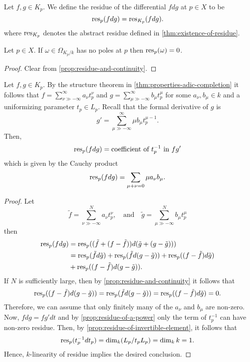 \begin{definition}\label{def:residue-at-p}
	Let $f,g \in K_{p}$. We define the residue of the differential $fdg$ at $p\in X$ to be
	\[
		\operatorname{res}_{p}(fdg) = \operatorname{res}_{K_{p}}(fdg).
	\]
	where $\operatorname{res}_{K_{p}}$ denotes the abstract residue defined in \cref{thm:existence-of-residue}.
\end{definition} 
\begin{proposition}\label{prop:no-poles-zero-residue}
	Let $p\in X$. If $\omega \in \Omega_{K_{p}/k}$ has no poles at $p$ then $\operatorname{res}_{p}(\omega) = 0$.
\end{proposition}
\begin{proof}
	Clear from \cref{prop:residue-and-continuity}.
\end{proof}

\begin{theorem}\label{thm:resiude-coincides-with-coefficient}
	Let $f,g \in K_{p}$. By the structure theorem in \cref{thm:properties-adic-completion} it follows that $f = \sum_{\nu \gg -\infty}^{\infty} a_{\nu}t_{p}^{\nu}$ and $g = \sum_{\mu \gg -\infty}^{\infty} b_{\mu}t_{p}^{\mu}$ for some $a_{\nu},b_{\mu} \in k$ and a uniformizing parameter $t_{p}\in L_{p} $. Recall that the formal derivative of $g$ is
	\[
		g' = \sum_{\mu \gg -\infty}^{\infty} \mu b_{\mu}t_{p}^{\mu -1}.
	\]
	Then,
	\[
		\operatorname{res}_{p}(fdg) = \text{coefficient of }t_{p}^{-1}\text{ in } fg'
	\]
	which is given by the Cauchy product
	\[
		\operatorname{res}_{p}(fdg) = \sum_{\mu + \nu = 0}\mu a_\nu{}b_{\mu}.
	\]
\end{theorem}
\begin{proof}
	Let
	\[
		\tilde{f} = \sum_{\nu\gg-\infty}^{N} a_{\nu}t_{p}^{\nu},\quad\text{and}\quad\tilde{g} = \sum_{\mu\gg-\infty}^{N} b_{\mu}t_{p}^{\mu}
	\]
	then 
	\begin{align*}
		\operatorname{res}_{p}(fdg) &= \operatorname{res}_{p}( (\tilde{f} + (f - \tilde{f}))d(\tilde{g} + (g - \tilde{g}))) \\
		&= \operatorname{res}_{p}(\tilde{f}d\tilde{g}) + \operatorname{res}_{p}(\tilde{f}d(g - \tilde{g})) + \operatorname{res}_{p}((f-\tilde{f}) d\tilde{g}) \\ &+ \operatorname{res}_{p}( (f - \tilde{f})d(g-\tilde{g})).
	\end{align*}
	If $N$ is sufficiently large, then by \cref{prop:residue-and-continuity} it follows that 
	\[
		\operatorname{res}_{p}( (f - \tilde{f})d(g-\tilde{g})) = \operatorname{res}_{p}(\tilde{f}d(g - \tilde{g})) = \operatorname{res}_{p}((f-\tilde{f}) d\tilde{g}) = 0.
	\]
	Therefore, we can assume that only finitely many of the $a_{\nu}$ and $b_{\mu}$ are non-zero. Now, $fdg = f g' dt$ and by \cref{prop:residue-of-a-power} only the term of $t_{p}^{-1}$ can have non-zero residue. Then, by \cref{prop:residue-of-invertible-element}, it follows that
	\[
		\operatorname{res}_{p}(t_{p}^{-1}dt_{p}) = \dim_{k}(L_{p}/t_{p}L_{p}) = \dim_{k}k = 1. 	
	\]
	Hence, $k$-linearity of residue implies the desired conclusion.
\end{proof}
